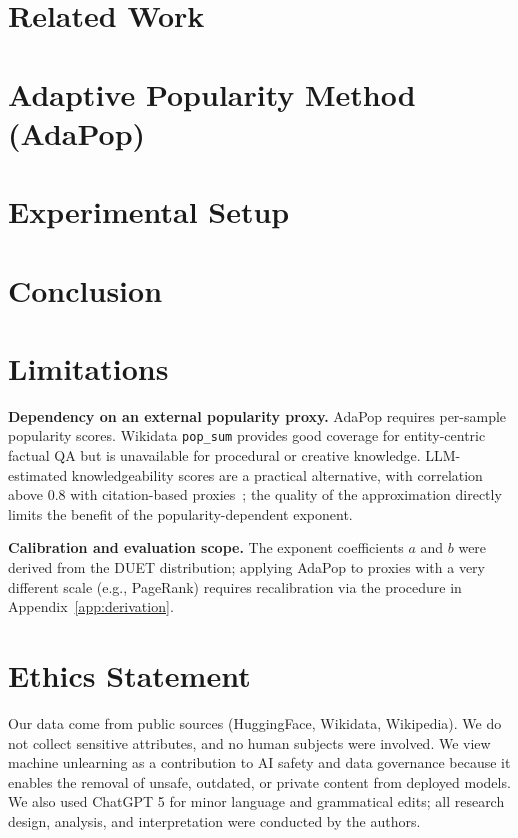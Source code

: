 \documentclass[11pt]{article}
\begin{document}
\section{Related Work}
\label{sec:related}
% 


\section{Adaptive Popularity Method (AdaPop)}
\label{sec:AdaPop}


\section{Experimental Setup}
\label{sec:experiments}


\section{Conclusion}
\label{sec:conclusion}




\section*{Limitations}
\textbf{Dependency on an external popularity proxy.}
AdaPop requires per-sample popularity scores. Wikidata \texttt{pop\_sum} provides good coverage for entity-centric factual QA but is unavailable for procedural or creative knowledge. LLM-estimated knowledgeability scores are a practical alternative, with correlation above $0.8$ with citation-based proxies~\cite{anna2026anatomy, marina2025llm}; the quality of the approximation directly limits the benefit of the popularity-dependent exponent.

\textbf{Calibration and evaluation scope.}
The exponent coefficients $a$ and $b$ were derived from the DUET distribution; applying AdaPop to proxies with a very different scale (e.g., PageRank) requires recalibration via the procedure in Appendix~\ref{app:derivation}. 


\section*{Ethics Statement}
Our data come from public sources (HuggingFace, Wikidata, Wikipedia). We do not collect sensitive attributes, and no human subjects were involved. We view machine unlearning as a contribution to AI safety and data governance because it enables the removal of unsafe, outdated, or private content from deployed models. We also used ChatGPT 5 for minor language and grammatical edits; all research design, analysis, and interpretation were conducted by the authors.




%


\appendix

\label{sec:appendix}

\end{document}
